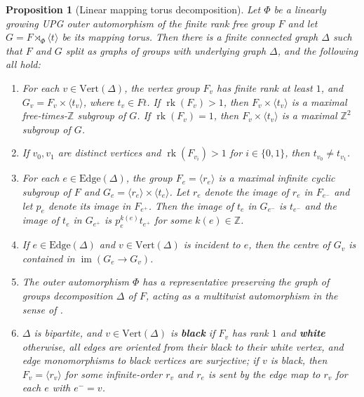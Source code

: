 \documentclass[11pt,oneside]{amsart}
\newcounter{ax}
\newtheorem{prop}[thm]{Proposition}
\theoremstyle{definition}
\DeclareMathOperator{\image}{im}
\DeclareMathOperator{\rank}{rk}
\newcommand{\field}[1]{\mathbb{#1}}
\newcommand{\integers}{\ensuremath{\field{Z}}}
\newcommand{\vertices}{\mathrm{Vert}}
\newcommand{\edges}{\mathrm{Edge}}
\begin{document}
\begin{prop}[Linear mapping torus decomposition]\label{prop:split-over-tori}
Let $\Phi$ be a linearly growing UPG outer automorphism of the finite rank free group $F$ and let $G=F\rtimes_\Phi\langle t\rangle$ be its mapping torus.  Then there is a finite connected graph $\Delta$ such that $F$ and $G$ split as graphs of groups with underlying graph $\Delta$, and the following all hold:
\begin{enumerate}
\item For each $v\in\vertices(\Delta)$, the vertex group $F_v$ has finite rank at least $1$, and $G_v=F_v\times \langle t_v\rangle$, where $t_v\in Ft$.  If $\rank(F_v)>1$, then $F_v\times\langle t_v\rangle$ is a maximal free-times-$\integers$ subgroup of $G$.  If $\rank(F_v)=1$, then $F_v\times\langle t_v\rangle$ is a maximal $\integers^2$ subgroup of $G$.\label{item:linear-vertices}

\item If $v_0,v_1$ are distinct vertices and $\rank(F_{v_i})>1$ for $i\in\{0,1\}$, then $t_{v_0}\neq t_{v_1}$.\label{item:different-vertex-groups}

\item For each $e\in\edges(\Delta)$, the group $F_e=\langle r_e\rangle$ is a maximal infinite cyclic subgroup of $F$ and $G_e=\langle r_e\rangle \times\langle t_e\rangle$.  Let $r_e$ denote the image of $r_e$ in $F_{e^-}$ and let $p_e$ denote its image in $F_{e^+}$.  Then the image of $t_e$ in $G_{e^-}$ is $t_{e^-}$ and the image of $t_e$ in $G_{e^+}$ is $p_e^{k(e)}t_{e^+}$ for some $k(e)\in\integers$.\label{item:linear-edges}

\item If $e\in\edges(\Delta)$ and $v\in\vertices(\Delta)$ is incident to $e$, then the centre of $G_v$ is contained in $\image(G_e\to G_v)$.\label{item:linear-centre}  

\item The outer automorphism $\Phi$ has a representative preserving the graph of groups decomposition $\Delta$ of $F$, acting as a multitwist automorphism in the sense of \cite[Sec. 6]{CohenLustig}.\label{item:linear-dehn}

 

 \item $\Delta$ is bipartite, and $v\in\vertices(\Delta)$ is \textbf{black} if $F_v$ has rank $1$ and \textbf{white} otherwise, all edges are oriented from their black to their white vertex, and edge monomorphisms to black vertices are surjective; if $v$ is black, then $F_v=\langle r_v\rangle$ for some infinite-order $r_v$ and $r_e$ is sent by the edge map to $r_v$ for each $e$ with $e^-=v$.\label{item:linear-bipartite}


\end{enumerate}
\end{prop}
\end{document}
